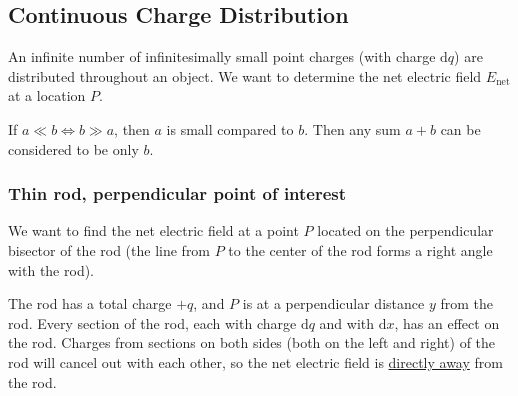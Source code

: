 \documentclass{article}
\newcommand{\theorem}[2]{\begin{tcolorbox}[title={#1},colback=blue!5!white,colframe=blue!75!black,parbox=false] #2 \end{tcolorbox}}
\begin{document}
\subsection{Continuous Charge Distribution}

An infinite number of infinitesimally small point charges (with charge $\mathrm{d}q$) are distributed throughout an object. We want to determine the net electric field $E_\text{net}$ at a location $P$.

\theorem{$\ll$ and $\gg$}{
	If $a\ll b\iff b\gg a$, then $a$ is small compared to $b$. Then any sum $a+b$ can be considered to be only $b$.
}

\subsubsection{Thin rod, perpendicular point of interest}

We want to find the net electric field at a point $P$ located on the perpendicular bisector of the rod (the line from $P$ to the center of the rod forms a right angle with the rod).

The rod has a total charge $+q$, and $P$ is at a perpendicular distance $y$ from the rod. Every section of the rod, each with charge $\mathrm{d}q$ and with $\mathrm{d}x$, has an effect on the rod. Charges from sections on both sides (both on the left and right) of the rod will cancel out with each other, so the net electric field is \ul{directly away} from the rod.
\end{document}
